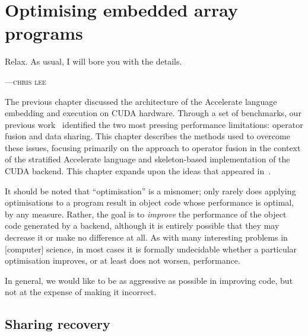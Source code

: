 
\chapter{Optimising embedded array programs}
\label{ch:optimising}
\epigraph{Relax. As usual, I will bore you with the details.}%
{\textsc{---chris lee}}

The previous chapter discussed the architecture of the Accelerate language
embedding and execution on CUDA hardware. Through a set of benchmarks, our
previous work~\cite{Chakravarty:2011fr} identified the two most pressing
performance limitations: operator fusion and data sharing. This chapter
describes the methods used to overcome these issues, focusing primarily on the
approach to operator fusion in the context of the stratified Accelerate language
and skeleton-based implementation of the CUDA backend. This chapter expands upon
the ideas that appeared in~\cite{McDonell:2013wi}.

It should be noted that ``optimisation'' is a misnomer; only rarely does
applying optimisations to a program result in object code whose performance is
optimal, by any measure. Rather, the goal is to \emph{improve} the performance
of the object code generated by a backend, although it is entirely possible that
they may decrease it or make no difference at all. As with many interesting
problems in [computer] science, in most cases it is formally undecidable whether
a particular optimisation improves, or at least does not worsen, performance.

In general, we would like to be as aggressive as possible in improving code, but
not at the expense of making it incorrect.


%

\section{Sharing recovery}
\label{sec:sharing_recovery}

